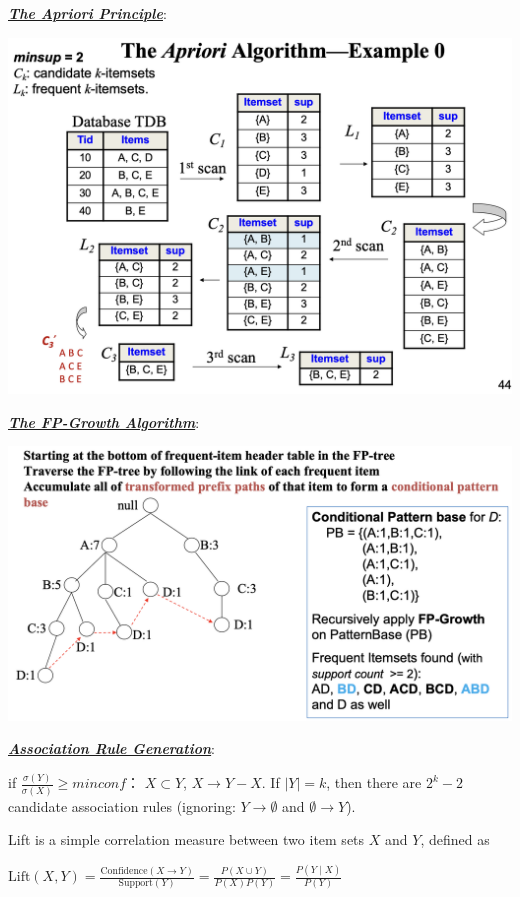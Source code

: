 \documentclass[12pt]{article}
\newcommand{\bulletPoint}[1]{\ul{\textit{\textbf{#1}}}}
\begin{document}
\begin{multicols*}{2}
\bulletPoint{The Apriori Principle}:

\includegraphics[scale=0.3]{images/Apriori.png}

\bulletPoint{The FP-Growth Algorithm}:

\includegraphics[scale=0.3]{images/FP-Growth.png}

\bulletPoint{Association Rule Generation}:

if  \(\frac{\sigma(Y)}{\sigma(X)} \geq \textit{minconf}\)：
$X\subset Y$,  \( X \rightarrow Y -X\).  If \( |Y| = k \), then there are \( 2^k - 2 \) candidate association rules (ignoring: \( Y \rightarrow \emptyset \) and \( \emptyset \rightarrow Y \)).  

Lift is a simple correlation measure between two item sets \(X\) and \(Y\), defined as

$\text{Lift}(X, Y) = \frac{\text{Confidence}(X \rightarrow Y)}{\text{Support}(Y)} = \frac{P(X \cup Y)}{P(X)P(Y)} = \frac{P(Y \mid X)}{P(Y)}$


\end{multicols*}
\end{document}
